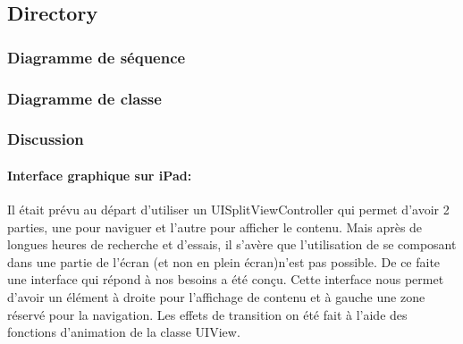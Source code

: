 	\subsection{Directory}
					\subsubsection*{Diagramme de séquence}

					\subsubsection*{Diagramme de classe}
					\subsubsection*{Discussion}
	
					\paragraph{Interface graphique sur iPad:} Il était prévu au départ d'utiliser un UISplitViewController qui permet d'avoir 2 parties, une pour naviguer et l'autre pour afficher le contenu. Mais après de longues heures  de recherche et d'essais, il s'avère que l'utilisation de se composant dans une partie de l'écran (et non en plein écran)n'est pas possible. De ce faite une interface qui répond à nos besoins a été conçu. Cette interface nous permet d'avoir un élément à droite pour l'affichage de contenu et à gauche une zone réservé pour la navigation. Les effets de transition on été fait à l'aide des fonctions d'animation de la classe UIView. 
	\lstset{
			    style = Xcode,
			    caption=Exemple de 2 animations à l'aide de la classe UIView. La première change la taille  et l'emplacement d'un élément graphique et la deuxième change sa transparence.,
			    breaklines=true,
			    frame=single
			}


